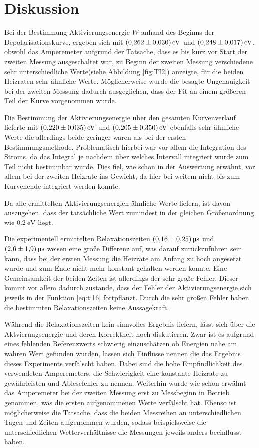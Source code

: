 \section{Diskussion}
\label{sec:Diskussion}
Bei der Bestimmung Aktivierungsenergie $W$ anhand des Beginns der Depolarisationskurve, ergeben sich mit $\SI{0.262+-0.030}{\electronvolt}$ und $\SI{0.248+-0.017}{\electronvolt}$, obwohl das Amperemeter
aufgrund der Tatsache, dass es bis kurz vor Start der zweiten Messung ausgeschaltet war, zu Beginn der zweiten Messung verschiedene sehr unterschiedliche Werte(siehe Abbildung \ref{fig:TI2})
anzeigte, für die beiden Heizraten sehr ähnliche Werte. Möglicherweise wurde die besagte Ungenauigkeit bei der zweiten Messung dadurch ausgeglichen, dass der Fit an einem größeren Teil der Kurve
vorgenommen wurde.


Die Bestimmung der Aktivierungsenergie über den gesamten Kurvenverlauf lieferte mit $\SI{0.220+-0.035}{\electronvolt}$ und $\SI{0.205+-0.35}{\electronvolt}$ ebenfalls sehr ähnliche Werte
die allerdings beide geringer waren als bei der ersten Bestimmungsmethode. Problematisch hierbei war vor allem die Integration des Stroms, da das Integral je nachdem über welches Intervall integriert
wurde zum Teil nicht bestimmbar wurde. Dies fiel, wie schon in der Auswertung erwähnt, vor allem bei der zweiten Heizrate ins Gewicht, da hier bei weitem nicht bis zum Kurvenende integriert werden konnte.


Da alle ermittelten Aktivierungsenergien ähnliche Werte liefern, ist davon auszugehen, dass der tatsächliche Wert zumindest in der gleichen Größenordnung wie $\SI{0.2}{\electronvolt}$ liegt.


Die experimentell ermittelten Relaxationszeiten $\SI{0.16+-0.25}{\micro\second}$ und $\SI{2.6+-1.9}{\micro\second}$ weisen eine große Differenz auf, was darauf zurückzuführen sein kann, dass
bei der ersten Messung die Heizrate am Anfang zu hoch angesetzt wurde und zum Ende nicht mehr konstant gehalten werden konnte. Eine Gemeinsamkeit der beiden Zeiten ist allerdings der sehr große
Fehler. Dieser kommt vor allem dadurch zustande, dass der Fehler der Aktivierungsenergie sich jeweils in der Funktion \eqref{eq:t:16} fortpflanzt. Durch die sehr großen Fehler haben die bestimmten
Relaxationszeiten keine Aussagekraft.


Während die Relaxationszeiten kein sinnvolles Ergebnis liefern, lässt sich über die Aktvierungsenergie und deren Korrektheit noch diskutieren.
Zwar ist es aufgrund eines fehlenden Referenzwerts schwierig einzuschätzen ob Energien nahe am wahren Wert gefunden wurden, lassen sich Einflüsse nennen
die das Ergebnis dieses Experiments verfälscht haben.
Dabei sind die hohe Empfindlichkeit des verwendeten Amperemeters, die Schwierigkeit eine konstante Heizrate zu gewährleisten und Ablesefehler zu nennen.
Weiterhin wurde wie schon erwähnt das Amperemeter bei der zweiten Messung erst zu Messbeginn in Betrieb genommen, was die ersten aufgenommenen Werte verfälscht hat.
Ebenso ist möglicherweise die Tatsache, dass die beiden Messreihen an unterschiedlichen Tagen und Zeiten aufgenommen wurden, sodass beispielsweise die unterschiedlichen Wetterverhältnisse
die Messungen jeweils anders beeinflusst haben.
